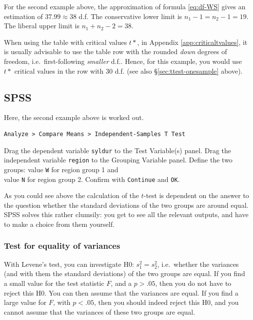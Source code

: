 \documentclass[
]{book}
\begin{document}
For the second example above, the approximation of formula
\eqref{eq:df-WS} gives
an estimation of \(37.99 \approx 38\) d.f. The conservative lower limit is
\(n_1-1 = n_2-1 = 19\). The liberal upper limit is \(n_1+n_2 -2 = 38\).

When using the table with critical values \(t*\), in
Appendix \ref{app:criticaltvalues}, it is usually advisable to use the table row
with the rounded \emph{down} degrees of freedom, i.e.~first-following \emph{smaller} d.f..
Hence, for this example, you would use \(t*\) critical values in the row with \(30\) d.f.
(see also §\ref{sec:ttest-onesample} above).

\hypertarget{sec:SPSS-ttest-unpaired}{%
\subsection{SPSS}\label{sec:SPSS-ttest-unpaired}}

Here, the second example above is worked out.

\begin{verbatim}
Analyze > Compare Means > Independent-Samples T Test
\end{verbatim}

Drag the dependent variable \texttt{syldur} to the Test Variable(s) panel.
Drag the independent variable \texttt{region} to the Grouping
Variable panel. Define the two groups: value \texttt{W} for region group 1 and\\
value \texttt{N} for region group 2. Confirm with \texttt{Continue} and \texttt{OK}.

As you could see above the calculation of the \(t\)-test is dependent on the
answer to the question whether the standard deviations of the two groups
are around equal. SPSS solves this rather clumsily: you get to see all the
relevant outputs, and have to make a choice from them yourself.

\hypertarget{test-for-equality-of-variances}{%
\subsubsection{Test for equality of variances}\label{test-for-equality-of-variances}}

With Levene's test, you can investigate H0: \(s^2_1 = s^2_2\), i.e.~whether
the variances (and with them the standard deviations) of the two groups
are equal. If you find a small value for the test statistic \(F\),
and a \(p>.05\), then you do not have to reject this H0. You can then assume
that the variances are equal. If you find a large value for \(F\),
with \(p<.05\), then you should indeed reject this H0, and you cannot
assume that the variances of these two groups are equal.
\end{document}
